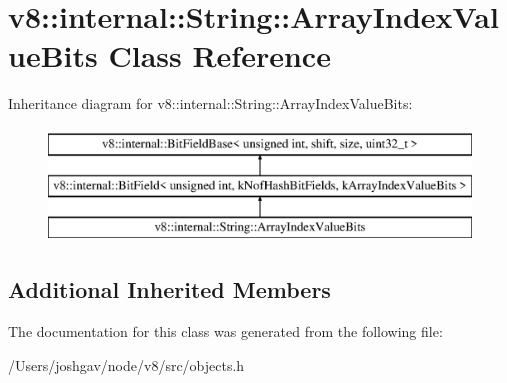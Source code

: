 \hypertarget{classv8_1_1internal_1_1_string_1_1_array_index_value_bits}{}\section{v8\+:\+:internal\+:\+:String\+:\+:Array\+Index\+Value\+Bits Class Reference}
\label{classv8_1_1internal_1_1_string_1_1_array_index_value_bits}
Inheritance diagram for v8\+:\+:internal\+:\+:String\+:\+:Array\+Index\+Value\+Bits\+:\begin{figure}[H]
\begin{center}
\leavevmode
\includegraphics[height=3.000000cm]{classv8_1_1internal_1_1_string_1_1_array_index_value_bits}
\end{center}
\end{figure}
\subsection*{Additional Inherited Members}


The documentation for this class was generated from the following file\+:\begin{DoxyCompactItemize}
\item 
/\+Users/joshgav/node/v8/src/objects.\+h\end{DoxyCompactItemize}
